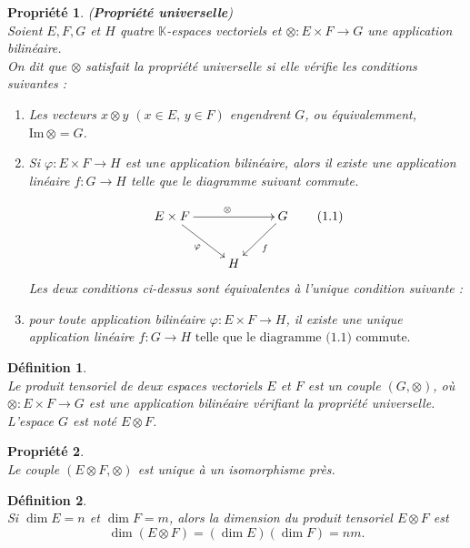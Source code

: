 \documentclass[a4paper, 14pt]{report}
\newtheorem{definition}{Définition}[section]
\newtheorem{propriety}{Propriété}[section]
\begin{document}
\begin{onehalfspace}
{			\begin{propriety}(\textbf{Propriété universelle}) \cite{greub2012linear}\\
Soient \( E,F ,G \) et \(H\) quatre \(\mathbb{K}\)-espaces vectoriels et \(\otimes : E \times F \to G \) une application bilinéaire. \\
On dit que $\otimes$ satisfait la \textit{propriété universelle} si elle vérifie les conditions suivantes :
				\begin{enumerate} [label=\roman*)]
					\item Les vecteurs $x \otimes y$ $(x \in E, \, y \in F)$ engendrent $G$, ou équivalemment, $\mathrm{Im} \, \otimes = G$.
					\item Si \(\varphi : E \times F \to H \) est une application bilinéaire, alors il existe une application linéaire $f : G \to H$ telle que le diagramme suivant commute.
					
					\[
					\xymatrix{
						E \times F \ar[rr]^{\otimes} \ar[dr]_{\varphi} & & G \ar[dl]^{f} \\
						& H &
					}  \quad \quad \text{(1.1)}
					\] 
					Les deux conditions ci-dessus sont équivalentes à l'unique condition suivante :
					\item pour toute application bilinéaire  $\varphi : E \times F \to H$,  il existe une unique application linéaire \(f : G \to H \text{ telle que le diagramme (1.1) commute.}\)
				\end{enumerate}
			\end{propriety}
			
			
			\begin{definition} \cite{greub2012linear}\\
				Le produit tensoriel de deux espaces vectoriels $E$ et $F$ est un couple $(G, \otimes)$, où $\otimes : E \times F \to G$ est une application bilinéaire vérifiant la propriété universelle.\\
				L'espace $G$ est noté $E \otimes F$.
			\end{definition}
			
			\begin{propriety} \cite{greub2012linear}\\
				Le couple \( (E \otimes F, \otimes) \) est unique à un isomorphisme près.
			\end{propriety}
			
			\begin{definition} \cite{axler2024linear}\\
				Si \( \dim E = n \) et \( \dim F = m \), alors la dimension du produit tensoriel \( E \otimes F \) est
				\[
				\dim(E \otimes F) = (\dim E) (\dim F) = nm.
				\]
			\end{definition}

}
\end{onehalfspace}
\end{document}
